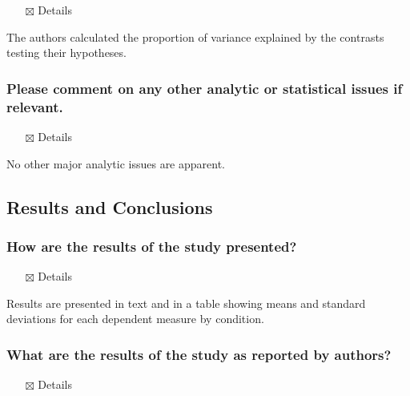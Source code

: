 \documentclass[
  doc, a4paper]{apa7}
\providecommand{\tightlist}{%
  \setlength{\itemsep}{0pt}\setlength{\parskip}{0pt}}
\begin{document}
\begin{itemize}
\tightlist
\item[$\boxtimes$]
  Details
\end{itemize}

The authors calculated the proportion of variance explained by the contrasts testing their hypotheses.

\subsubsection{Please comment on any other analytic or statistical issues if relevant.}\label{please-comment-on-any-other-analytic-or-statistical-issues-if-relevant.}

\begin{itemize}
\tightlist
\item[$\boxtimes$]
  Details
\end{itemize}

No other major analytic issues are apparent.

\subsection{Results and Conclusions}\label{results-and-conclusions}

\subsubsection{How are the results of the study presented?}\label{how-are-the-results-of-the-study-presented}

\begin{itemize}
\tightlist
\item[$\boxtimes$]
  Details
\end{itemize}

Results are presented in text and in a table showing means and standard deviations for each dependent measure by condition.

\subsubsection{What are the results of the study as reported by authors?}\label{what-are-the-results-of-the-study-as-reported-by-authors}

\begin{itemize}
\tightlist
\item[$\boxtimes$]
  Details
\end{itemize}
\end{document}
